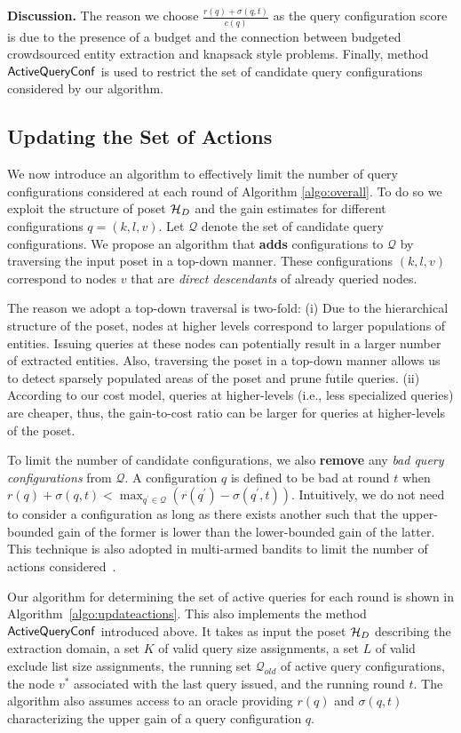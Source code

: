 \vspace{2pt}\noindent\textbf{Discussion.} The reason we choose $\frac{r(q) + \sigma(q,t)}{c(q)}$ as the query configuration score is due to the presence of a budget and the connection between budgeted crowdsourced entity extraction and knapsack style problems. Finally, method ${\sf ActiveQueryConf}$ is used to restrict the set of candidate query configurations considered by our algorithm. 

\subsection{Updating the Set of Actions}
\label{sec:badactions}
We now introduce an algorithm to effectively limit the number of query configurations considered at each round of Algorithm \ref{algo:overall}. To do so we exploit the structure of poset $\mathcal{H}_D$ and the gain estimates for different configurations $q = (k,l,v)$. Let $\mathcal{Q}$ denote the set of candidate query configurations. We propose an algorithm that {\bf adds} configurations to $\mathcal{Q}$ by traversing the input poset in a top-down manner. These configurations $(k,l,v)$ correspond to nodes $v$ that are {\em direct descendants} of already queried nodes. 

The reason we adopt a top-down traversal is two-fold: (i) Due to the hierarchical structure of the poset, nodes at higher levels correspond to larger populations of entities. Issuing queries at these nodes can potentially result in a larger number of extracted entities. Also, traversing the poset in a top-down manner allows us to detect sparsely populated areas of the poset and prune futile queries. (ii) According to our cost model, queries at higher-levels (i.e., less specialized queries) are cheaper, thus, the gain-to-cost ratio can be larger for queries at higher-levels of the poset.

To limit the number of candidate configurations, we also {\bf remove} any {\em bad query configurations} from $\mathcal{Q}$. A configuration $q$ is defined to be bad at round $t$ when $r(q) + \sigma(q,t) < \max_{q^{\prime} \in \mathcal{Q}} (r(q^{\prime}) - \sigma(q^{\prime},t))$. Intuitively, we do not need to consider a configuration as long as there exists another such that the upper-bounded gain of the former is lower than the lower-bounded gain of the latter. This technique is also adopted in multi-armed bandits to limit the number of actions considered~\cite{EvenDar06actionelimination}. 

Our algorithm for determining the set of active queries for each round is shown in Algorithm~\ref{algo:updateactions}. This also implements the method ${\sf ActiveQueryConf}$ introduced above. It takes as input the poset $\mathcal{H}_D$ describing the extraction domain, a set $K$ of valid query size assignments, a set $L$ of valid exclude list size assignments, the running set $\mathcal{Q}_{old}$ of active query configurations, the node $v^*$ associated with the last query issued, and the running round $t$. The algorithm also assumes access to an oracle providing $r(q)$ and $\sigma(q,t)$ characterizing the upper gain of a query configuration $q$.

